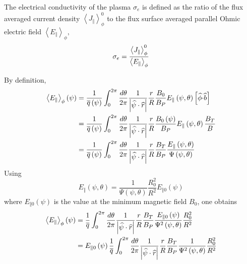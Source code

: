 The electrical conductivity of the plasma $\sigma_{e}$ is defined as the
ratio of the flux averaged current density $\left\langle
J_{\Vert}\right\rangle _{\phi}^{0}$ to the flux surface averaged parallel
Ohmic electric field $\left\langle E_{\Vert}\right\rangle _{\phi},$%
\begin{equation}
\sigma_{e}=\frac{\left\langle J_{\Vert}\right\rangle _{\phi}^{0}}{%
\left\langle E_{\Vert}\right\rangle _{\phi}}
\end{equation}

By definition,
\begin{align}
\left\langle E_{\Vert}\right\rangle _{\phi}\left( \psi\right) & =\frac {1}{%
\overline{q}\left( \psi\right) }\int_{0}^{2\pi}\frac{d\theta}{2\pi}\frac{1}{%
\left| \widehat{\psi}\cdot\widehat{r}\right| }\frac{r}{R}\frac{B_{0}}{B_{P}}
E_{\Vert}\left( \psi,\theta\right) \left[ \widehat{\phi }\mathbf{\cdot}%
\widehat{b}\right]  \nonumber \\
& =\frac{1}{\overline{q}\left( \psi\right) }\int_{0}^{2\pi}\frac{d\theta }{
2\pi}\frac{1}{\left| \widehat{\psi}\cdot\widehat{r}\right| }\frac{r}{R}\frac{
B_{0}\left( \psi\right) }{B_{P}}E_{\Vert}\left( \psi ,\theta\right) \frac{
B_{T}}{B}  \nonumber \\
& =\frac{1}{\overline{q}\left( \psi\right) }\int_{0}^{2\pi}\frac{d\theta }{
2\pi}\frac{1}{\left| \widehat{\psi}\cdot\widehat{r}\right| }\frac{r}{R}\frac{
B_{T}}{B_{P}}\frac{E_{\Vert}\left( \psi,\theta\right) }{\Psi\left(
\psi,\theta\right) }
\end{align}
Using
\begin{equation}
E_{\Vert}\left( \psi,\theta\right) =\frac{1}{\Psi\left( \psi,\theta\right) }%
\frac{R_{0}^{2}}{R^{2}}E_{\Vert0}\left( \psi\right)
\end{equation}
where $E_{\Vert0}\left( \psi\right) $ is the value at the minimum magnetic
field $B_{0}$, one obtains
\begin{align}
\left\langle E_{\Vert}\right\rangle _{\phi}\left( \psi\right) & =\frac {1}{%
\overline{q}}\int_{0}^{2\pi}\frac{d\theta}{2\pi}\frac{1}{\left| \widehat{\psi%
}\cdot\widehat{r}\right| }\frac{r}{R}\frac{B_{T}}{B_{P}}\frac{
E_{\Vert0}\left( \psi\right) }{\Psi^{2}\left( \psi,\theta\right) }\frac{
R_{0}^{2}}{R^{2}}  \nonumber \\
& =E_{\Vert0}\left( \psi\right) \frac{1}{\overline{q}}\int_{0}^{2\pi}\frac{
d\theta}{2\pi}\frac{1}{\left| \widehat{\psi}\cdot\widehat{r}\right| }\frac{r%
}{R}\frac{B_{T}}{B_{P}}\frac{1}{\Psi^{2}\left( \psi,\theta\right) }\frac{
R_{0}^{2}}{R^{2}}
\end{align}
